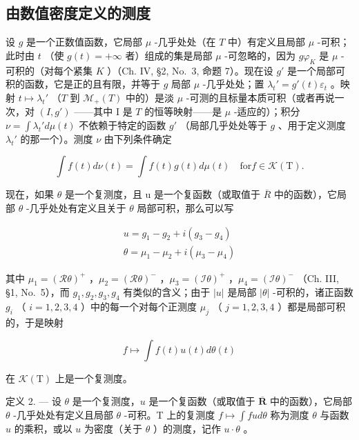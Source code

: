 \subsection{由数值密度定义的测度}

设 \(g\) 是一个正数值函数，它局部 \(\mu\) -几乎处处（在 \(T\) 中）有定义且局部 \(\mu\) -可积；此时由 \(t\) （使 \(g(t) = +\infty\) 者）组成的集是局部 \(\mu\) -可忽略的，因为 \(g\varphi_{K}\) 是 \(\mu\) -可积的（对每个紧集 \(K\) ）（Ch. IV, §2, No.~3, 命题 7）。现在设 \(g'\) 是一个局部可积的函数，它是正的且有限，并等于 \(g\) 局部 \(\mu\) -几乎处处；置 \(\lambda_t' = g'(t)\varepsilon_t\) 。映射 \(t \mapsto \lambda_t'\) （\(T\) 到 \(\mathcal{M}_+(T)\) 中的）是淡 \(\mu\) -可测的且标量本质可积（或者再说一次，对 \((I,g')\) ——其中 I 是 \(T\) 的恒等映射——是 \(\mu\) -适应的）；积分 \(\nu = \int \lambda_t' d\mu(t)\) 不依赖于特定的函数 \(g'\) （局部几乎处处等于 \(g\) 、用于定义测度 \(\lambda_t'\) 的那一个）。测度 \(\nu\) 由下列条件确定

\[
\int f (t) d \nu (t) = \int f (t) g (t) d \mu (t) \quad \mathrm{for} f \in \mathcal {K} (\mathrm{T}).\tag{1}
\]

现在，如果 \(\theta\) 是一个复测度，且 u 是一个复函数（或取值于 \(\overline{R}\) 中的函数），它局部 \(\theta\) -几乎处处有定义且关于 \(\theta\) 局部可积，那么可以写

\[
\begin{array}{l} {u = g _ {1} - g _ {2} + i (g _ {3} - g _ {4})} \\ {\theta = \mu_ {1} - \mu_ {2} + i (\mu_ {3} - \mu_ {4})} \end{array}\tag{2}
\]

其中 \(\mu_{1} = (\mathcal{R}\theta)^{+}\) ，\(\mu_{2} = (\mathcal{R}\theta)^{-}\) ，\(\mu_{3} = (\mathcal{I}\theta)^{+}\) ，\(\mu_{4} = (\mathcal{I}\theta)^{-}\) （Ch. III, §1, No.~5），而 \(g_{1}, g_{2}, g_{3}, g_{4}\) 有类似的含义；由于 \(|u|\) 是局部 \(|\theta|\) -可积的，诸正函数 \(g_{i}\) （ \(i = 1, 2, 3, 4\) ）中的每一个对每个正测度 \(\mu_{j}\) （ \(j = 1, 2, 3, 4\) ）都是局部可积的，于是映射

\[
f \mapsto \int f (t) u (t) d \theta (t)
\]

在 \(\mathcal{K}(\mathrm{T})\) 上是一个复测度。

定义 2. --- 设 \(\theta\) 是一个复测度，\(u\) 是一个复函数（或取值于 \(\overline{\mathbf{R}}\) 中的函数），它局部 \(\theta\) -几乎处处有定义且局部 \(\theta\) -可积。T 上的复测度 \(f \mapsto \int f u d\theta\) 称为测度 \(\theta\) 与函数 \(u\) 的乘积，或以 \(u\) 为密度（关于 \(\theta\) ）的测度，记作 \(u \cdot \theta\) 。


